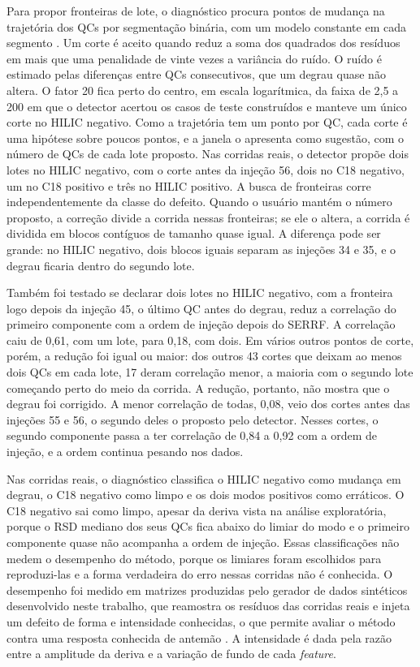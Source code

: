 Para propor fronteiras de lote, o diagnóstico procura pontos de mudança na trajetória dos QCs por segmentação binária, com um modelo constante em cada segmento \cite{truong2020selective}. Um corte é aceito quando reduz a soma dos quadrados dos resíduos em mais que uma penalidade de vinte vezes a variância do ruído. O ruído é estimado pelas diferenças entre QCs consecutivos, que um degrau quase não altera. O fator 20 fica perto do centro, em escala logarítmica, da faixa de 2,5 a 200 em que o detector acertou os casos de teste construídos e manteve um único corte no HILIC negativo. Como a trajetória tem um ponto por QC, cada corte é uma hipótese sobre poucos pontos, e a janela o apresenta como sugestão, com o número de QCs de cada lote proposto. Nas corridas reais, o detector propõe dois lotes no HILIC negativo, com o corte antes da injeção 56, dois no C18 negativo, um no C18 positivo e três no HILIC positivo. A busca de fronteiras corre independentemente da classe do defeito. Quando o usuário mantém o número proposto, a correção divide a corrida nessas fronteiras; se ele o altera, a corrida é dividida em blocos contíguos de tamanho quase igual. A diferença pode ser grande: no HILIC negativo, dois blocos iguais separam as injeções 34 e 35, e o degrau ficaria dentro do segundo lote.

Também foi testado se declarar dois lotes no HILIC negativo, com a fronteira logo depois da injeção 45, o último QC antes do degrau, reduz a correlação do primeiro componente com a ordem de injeção depois do SERRF. A correlação caiu de 0,61, com um lote, para 0,18, com dois. Em vários outros pontos de corte, porém, a redução foi igual ou maior: dos outros 43 cortes que deixam ao menos dois QCs em cada lote, 17 deram correlação menor, a maioria com o segundo lote começando perto do meio da corrida. A redução, portanto, não mostra que o degrau foi corrigido. A menor correlação de todas, 0,08, veio dos cortes antes das injeções 55 e 56, o segundo deles o proposto pelo detector. Nesses cortes, o segundo componente passa a ter correlação de 0,84 a 0,92 com a ordem de injeção, e a ordem continua pesando nos dados.

Nas corridas reais, o diagnóstico classifica o HILIC negativo como mudança em degrau, o C18 negativo como limpo e os dois modos positivos como erráticos. O C18 negativo sai como limpo, apesar da deriva vista na análise exploratória, porque o RSD mediano dos seus QCs fica abaixo do limiar do modo e o primeiro componente quase não acompanha a ordem de injeção. Essas classificações não medem o desempenho do método, porque os limiares foram escolhidos para reproduzi-las e a forma verdadeira do erro nessas corridas não é conhecida. O desempenho foi medido em matrizes produzidas pelo gerador de dados sintéticos desenvolvido neste trabalho, que reamostra os resíduos das corridas reais e injeta um defeito de forma e intensidade conhecidas, o que permite avaliar o método contra uma resposta conhecida de antemão \cite{morris2019using}. A intensidade é dada pela razão entre a amplitude da deriva e a variação de fundo de cada \emph{feature}.

